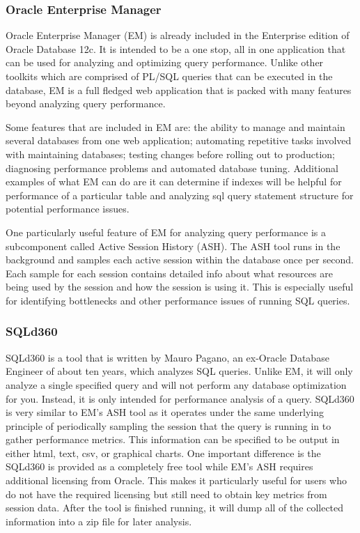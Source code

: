 \documentclass[draftclsnofoot, onecolumn, compsoc, 10pt]{IEEEtran}
\begin{document}
\subsubsection{Oracle Enterprise Manager}
Oracle Enterprise Manager (EM) is already included in the Enterprise edition of Oracle Database 12c.
It is intended to be a one stop, all in one application that can be used for analyzing and optimizing query performance. 
Unlike other toolkits which are comprised of PL/SQL queries that can be executed in the database, EM is a full fledged web application that is packed with many features beyond analyzing query performance. 

Some features that are included in EM are: the ability to manage and maintain several databases from one web application; automating repetitive tasks involved with maintaining databases; testing changes before rolling out to production; diagnosing performance problems and automated database tuning. 
Additional examples of what EM can do are it can determine if indexes will be helpful for performance of a particular table and analyzing sql query statement structure for potential performance issues.

One particularly useful feature of EM for analyzing query performance is a subcomponent called Active Session History (ASH). 
The ASH tool runs in the background and samples each active session within the database once per second. 
Each sample for each session contains detailed info about what resources are being used by the session and how the session is using it. 
This is especially useful for identifying bottlenecks and other performance issues of running SQL queries.

\subsubsection{SQLd360}
SQLd360 is a tool that is written by Mauro Pagano, an ex-Oracle Database Engineer of about ten years, which analyzes SQL queries.
Unlike EM, it will only analyze a single specified query and will not perform any database optimization for you.  
Instead, it is only intended for performance analysis of a query. 
SQLd360 is very similar to EM’s ASH tool as it operates under the same underlying principle of periodically sampling the session that the query is running in to gather performance metrics. 
This information can be specified to be output in either html, text, csv, or graphical charts. One important difference is the SQLd360 is provided as a completely free tool while EM’s ASH requires additional licensing from Oracle. 
This makes it particularly useful for users who do not have the required licensing but still need to obtain key metrics from session data. 
After the tool is finished running, it will dump all of the collected information into a zip file for later analysis.
\end{document}
